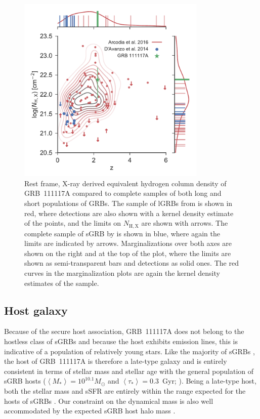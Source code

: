 \documentclass[longauth]{aa}    %
\begin{document}
\begin{figure}
      \centering \includegraphics[width=9cm]{figures/NH_z.pdf} 
\caption{Rest frame, X-ray derived equivalent hydrogen column density of
        GRB~111117A compared to complete samples of both long and short populations of
        GRBs. The sample of lGRBs from \citet{Arcodia2016} is shown in red, where
        detections are also shown with a kernel density estimate of the points, and the
        limits on $N_\mathrm{H,X}$ are shown with arrows. The complete sample of sGRB by
        \citet{DAvanzo2014a} is shown in blue, where again the limits are indicated by
        arrows. Marginalizations over both axes are shown on the right and at the top of
        the plot, where the limits are shown as semi-transparent bars and detections as
        solid ones. The red curves in the marginalization plots are again the kernel
        density estimates of the \citet{Arcodia2016} sample.} \label{fig:NH_z}
\end{figure}


\subsection{Host galaxy}

Because of the secure host association, GRB~111117A does not belong to the
hostless class of sGRBs \citep{Berger2010a} and because the host exhibits
emission lines, this is indicative of a population of relatively young stars.
Like the majority of sGRBs \citep{Fong2013b}, the host of GRB~111117A is
therefore a late-type galaxy and is entirely consistent in terms of stellar mass
and stellar age with the general population of sGRB hosts ($\left\langle M _*
\right\rangle = 10^{10.1} M_{\odot}$ and $\left\langle \tau _* \right\rangle =
0.3 $~Gyr; \citealt{Leibler2010}). Being a late-type host, both the stellar mass
and sSFR are entirely within the range expected for the hosts of sGRBs
\citep{Behroozi2014}. Our constraint on the dynamical mass is also well
accommodated by the expected sGRB host halo mass \citep{Behroozi2014}.
\end{document}
